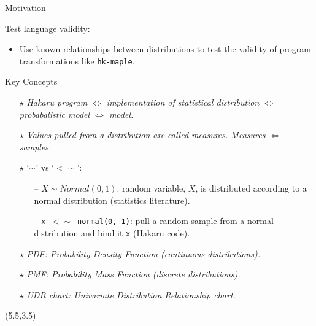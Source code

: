 \documentclass[22pt]{beamer}
\begin{document}
\begin{frame}[fragile]
\begin{textblock}{5}
\begin{block}{\Large{Motivation}}
\bigskip
\footnotesize{Test language validity: 
\begin{itemize}
  \item Use known relationships between distributions to test the validity of program transformations like {\tt \footnotesize{hk-maple}}.
\end{itemize} }
\justifying


\end{block}



\begin{block}{\Large{Key Concepts}}
\justifying

\footnotesize{
\begin{itemize}
  \item[\textbf{$\star$}] \textit{Hakaru program $\Longleftrightarrow$ implementation of statistical distribution $\Longleftrightarrow$ probabalistic model $\Longleftrightarrow$ model.}
  \item[\textbf{$\star$}] \textit{Values pulled from a distribution are called measures. Measures $\Longleftrightarrow$ samples.}
  \item[\textbf{$\star$}] `{\textbf{$\sim$}}' vs `{\textbf{$<\sim$}}':
      \begin{itemize}
          \footnotesize
          \item[--] \footnotesize{$X \sim Normal(0, 1)$: random variable, $X$, is distributed according to a normal distribution (statistics literature).}
          \item[--] \footnotesize{{\tt \footnotesize{x $<\sim$ normal(0, 1)}}: pull a random sample from a normal distribution and bind it {\tt \footnotesize{x}} (Hakaru code).}
      \end{itemize}
  \item[\textbf{$\star$}] \textit{PDF: Probability Density Function (continuous distributions).}
  \item[\textbf{$\star$}] \textit{PMF: Probability Mass Function (discrete distributions).}
  \item[\textbf{$\star$}] \textit{UDR chart: Univariate Distribution Relationship chart.}
\end{itemize}
}
\end{block}


\begin{textblock}{5}(5.5,3.5)





\end{textblock}
\end{textblock}
\end{frame}
\end{document}
